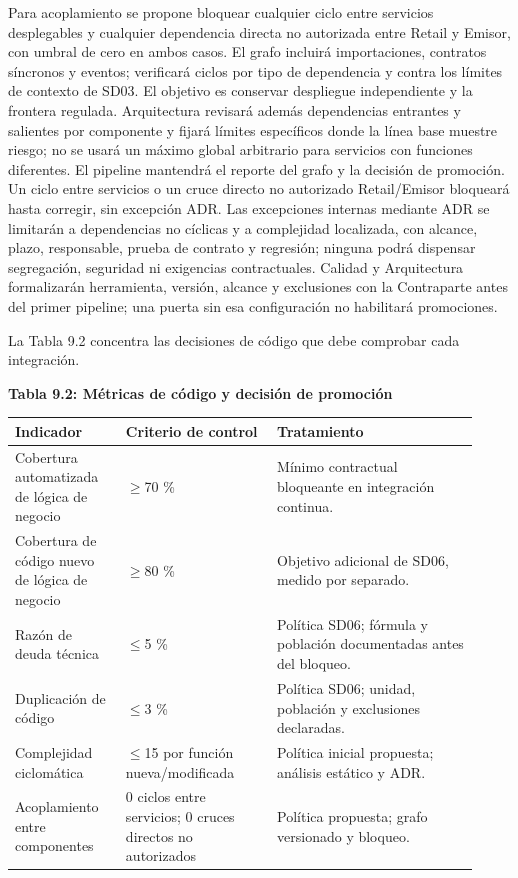 \documentclass[11pt]{article}
\begin{document}
Para acoplamiento se propone bloquear cualquier ciclo entre servicios desplegables y cualquier dependencia directa no autorizada entre Retail y Emisor, con umbral de cero en ambos casos. El grafo incluirá importaciones, contratos síncronos y eventos; verificará ciclos por tipo de dependencia y contra los límites de contexto de SD03. El objetivo es conservar despliegue independiente y la frontera regulada. Arquitectura revisará además dependencias entrantes y salientes por componente y fijará límites específicos donde la línea base muestre riesgo; no se usará un máximo global arbitrario para servicios con funciones diferentes. El pipeline mantendrá el reporte del grafo y la decisión de promoción. Un ciclo entre servicios o un cruce directo no autorizado Retail/Emisor bloqueará hasta corregir, sin excepción ADR. Las excepciones internas mediante ADR se limitarán a dependencias no cíclicas y a complejidad localizada, con alcance, plazo, responsable, prueba de contrato y regresión; ninguna podrá dispensar segregación, seguridad ni exigencias contractuales. Calidad y Arquitectura formalizarán herramienta, versión, alcance y exclusiones con la Contraparte antes del primer pipeline; una puerta sin esa configuración no habilitará promociones.

La Tabla 9.2 concentra las decisiones de código que debe comprobar cada integración.

\textbf{Tabla 9.2: Métricas de código y decisión de promoción}

\begin{longtable}{p{0.22\linewidth}p{0.3\linewidth}p{0.4\linewidth}}
\toprule
Indicador & Criterio de control & Tratamiento \\
\midrule
\endhead
Cobertura automatizada de lógica de negocio & $\geq$70 \% & Mínimo contractual bloqueante en integración continua. \\
Cobertura de código nuevo de lógica de negocio & $\geq$80 \% & Objetivo adicional de SD06, medido por separado. \\
Razón de deuda técnica & $\leq$5 \% & Política SD06; fórmula y población documentadas antes del bloqueo. \\
Duplicación de código & $\leq$3 \% & Política SD06; unidad, población y exclusiones declaradas. \\
Complejidad ciclomática & $\leq$15 por función nueva/modificada & Política inicial propuesta; análisis estático y ADR. \\
Acoplamiento entre componentes & 0 ciclos entre servicios; 0 cruces directos no autorizados & Política propuesta; grafo versionado y bloqueo. \\
\bottomrule
\end{longtable}
\end{document}
